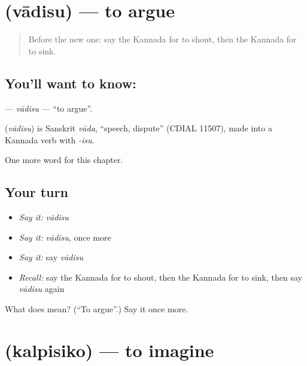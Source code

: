 \section[\texorpdfstring{\kn{ವಾದಿಸು} (vādisu)}{ವಾದಿಸು (vādisu)}]{ (vādisu) — to argue}

\label{lesson:KA-C240-vadisu}



\begin{quote}
Before the new one: say the Kannada for to shout, then the Kannada for to sink.
\end{quote}

\subsection*{You'll want to know: }
\textbf{} — \emph{vādisu} — \textquotedblleft{}to argue\textquotedblright{}.

\begin{cousinweb}
\textbf{} (\emph{vādisu}) is Sanskrit \emph{vāda}, \textquotedblleft{}speech, dispute\textquotedblright{} (CDIAL 11507), made into a Kannada verb with \emph{-isu}.
\end{cousinweb}

\begin{grammarlens}[title={What you've built}]
One more word for this chapter.
\end{grammarlens}

\subsection*{Your turn}
\begin{itemize}
\raggedright
  \item \emph{Say it:} \emph{vādisu}
  \item \emph{Say it:} \emph{vādisu}, once more
  \item \emph{Say it:} say \emph{vādisu}
  \item \emph{Recall:} say the Kannada for to shout, then the Kannada for to sink, then say \emph{vādisu} again
\end{itemize}

\begin{tcolorbox}[breakable,colback=teal!4,colframe=teal!35!black,title={Before you move on}]
What does  mean? (\textquotedblleft{}To argue\textquotedblright{}.) Say it once more.
\end{tcolorbox}
\section[\texorpdfstring{\kn{ಕಲ್ಪಿಸಿಕೊ} (kalpisiko)}{ಕಲ್ಪಿಸಿಕೊ (kalpisiko)}]{ (kalpisiko) — to imagine}


